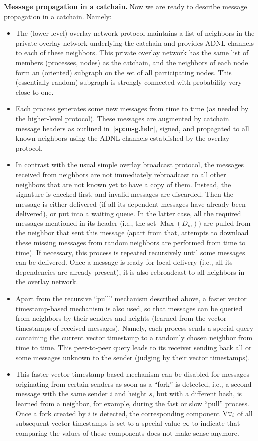 \documentclass[12pt,oneside]{article}
\def\makepoint#1{\medbreak\noindent{\bf #1.\ }}
\def\nxpoint{\refstepcounter{subsection}%
  \smallbreak\makepoint{\thesubsection}}
\def\refpoint#1{{\rm\textbf{\ref{#1}}}}
\let\ptref=\refpoint
\def\emb#1{\textbf{#1.}}
\def\opsc#1{\operatorname{\textsc{#1}}}
\def\Max{\operatorname{Max}}
\def\VT{\opsc{Vt}}
\begin{document}
\nxpoint\emb{Message propagation in a catchain}\label{sp:cc.msg.prop}
Now we are ready to describe message propagation in a catchain. Namely:
\begin{itemize}
\item The (lower-level) overlay network protocol maintains a list of neighbors in the private overlay network underlying the catchain and provides ADNL channels to each of these neighbors. This private overlay network has the same list of members (processes, nodes) as the catchain, and the neighbors of each node form an (oriented) subgraph on the set of all participating nodes. This (essentially random) subgraph is strongly connected with probability very close to one.
\item Each process generates some new messages from time to time (as needed by the higher-level protocol). These messages are augmented by catchain message headers as outlined in~\ptref{sp:msg.hdr}, signed, and propagated to all known neighbors using the ADNL channels established by the overlay protocol.
\item In contrast with the usual simple overlay broadcast protocol, the messages received from neighbors are not immediately rebroadcast to all other neighbors that are not known yet to have a copy of them. Instead, the signature is checked first, and invalid messages are discarded. Then the message is either delivered (if all its dependent messages have already been delivered), or put into a waiting queue. In the latter case, all the required messages mentioned in its header (i.e., the set $\Max(D_m)$) are pulled from the neighbor that sent this message (apart from that, attempts to download these missing messages from random neighbors are performed from time to time). If necessary, this process is repeated recursively until some messages can be delivered. Once a message is ready for local delivery (i.e., all its dependencies are already present), it is also rebroadcast to all neighbors in the overlay network.
\item Apart from the recursive ``pull'' mechanism described above, a faster vector timestamp-based mechanism is also used, so that messages can be queried from neighbors by their senders and heights (learned from the vector timestamps of received messages). Namely, each process sends a special query containing the current vector timestamp to a randomly chosen neighbor from time to time. This peer-to-peer query leads to its receiver sending back all or some messages unknown to the sender (judging by their vector timestamps).
\item This faster vector timestamp-based mechanism can be disabled for messages originating from certain senders as soon as a ``fork'' is detected, i.e., a second message with the same sender $i$ and height $s$, but with a different hash, is learned from a neighbor, for example, during the fast or slow ``pull'' process. Once a fork created by $i$ is detected, the corresponding component $\VT_i$ of all subsequent vector timestamps is set to a special value $\infty$ to indicate that comparing the values of these components does not make sense anymore.

\end{itemize}
\end{document}
